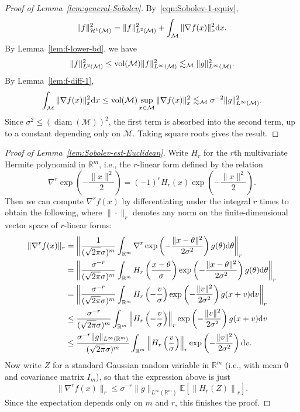 \documentclass[preprint]{imsart}
\theoremstyle{plain}
\theoremstyle{definition}
\newcommand{\Rbb}{\mathbb{R}}
\newcommand{\Ebb}{\mathbb{E}}
\newcommand{\Mcal}{\mathcal{M}}
\newcommand{\Hcal}{\mathcal{H}}
\newcommand{\diff}{\textnormal{d}}
\newcommand{\vol}{\textnormal{vol}}
\DeclareMathOperator{\diam}{diam}
\begin{document}
\begin{appendix}
\begin{proof}[Proof of Lemma~\ref{lem:general-Sobolev}]
By~\eqref{eqn:Sobolev-1-equiv},
\[
    \|f\|_{\Hcal^1(\Mcal)}^2
    =
    \|f\|_{L^2(\Mcal)}^2
    +
    \int_{\Mcal}\|\nabla f(x)\|_x^2\diff x.
\]
By Lemma~\ref{lem:f-lower-bd}, we have
\[
    \|f\|_{L^2(\Mcal)}^2
    \le
    \vol(\Mcal)\|f\|_{L^\infty(\Mcal)}^2
    \lesssim_\Mcal
    \|g\|_{L^\infty(\Mcal)}^2.
\]
By Lemma~\ref{lem:f-diff-1},
\[
    \int_{\Mcal}\|\nabla f(x)\|_x^2\diff x
    \le
    \vol(\Mcal)\sup_{x\in\Mcal}\|\nabla f(x)\|_x^2
    \lesssim_\Mcal
    \sigma^{-2}\|g\|_{L^\infty(\Mcal)}^2.
\]
Since $\sigma^2\le(\diam(\Mcal))^2$, the first term is absorbed into the second term, up to a constant depending only on $\Mcal$.
Taking square roots gives the result.
\end{proof}


\begin{proof}[Proof of Lemma~\ref{lem:Sobolev-est-Euclidean}]
    Write $H_r$ for the $r$th multivariate Hermite polynomial in $\Rbb^m$, i.e., the $r$-linear form defined by the relation
    \begin{equation*}
        \nabla^r\exp\left(-\frac{\|x\|^2}{2}\right) = (-1)^r H_r(x)\exp\left(-\frac{\|x\|^2}{2}\right).
    \end{equation*}
    Then we can compute $\nabla^r f(x)$ by differentiating under the integral $r$ times to obtain the following, where $\|\cdot\|_r$ denotes any norm on the finite-dimensional vector space of $r$-linear forms:
    \begin{align*}
        \|\nabla^rf(x)\|_{r} &= \left\|\frac{1}{(\sqrt{2\pi}\sigma)^m}\int_{\Rbb^m}\nabla^r\exp\left(-\frac{\|x-\theta\|^2}{2\sigma^2}\right)g(\theta)\diff \theta\right\|_{r} \\
        &= \left\|\frac{\sigma^{-r}}{(\sqrt{2\pi}\sigma)^m}\int_{\Rbb^m}H_r\left(\frac{x-\theta}{\sigma}\right)\exp\left(-\frac{\|x-\theta\|^2}{2\sigma^2}\right)g(\theta)\diff \theta\right\|_{r} \\
        &= \left\|\frac{\sigma^{-r}}{(\sqrt{2\pi}\sigma)^m}\int_{\Rbb^m}H_r\left(-\frac{v}{\sigma}\right)\exp\left(-\frac{\|v\|^2}{2\sigma^2}\right)g(x+v)\diff v\right\|_{r} \\
        &\le \frac{\sigma^{-r}}{(\sqrt{2\pi}\sigma)^m}\int_{\Rbb^m}\left\|H_r\left(-\frac{v}{\sigma}\right)\right\|_{r}\exp\left(-\frac{\|v\|^2}{2\sigma^2}\right)g(x+v)\diff v \\
        &\le \frac{\sigma^{-r}\|g\|_{L^{\infty}(\Rbb^m)}}{(\sqrt{2\pi}\sigma)^m}\int_{\Rbb^m}\left\|H_r\left(\frac{v}{\sigma}\right)\right\|_{r}\exp\left(-\frac{\|v\|^2}{2\sigma^2}\right)\diff v.
    \end{align*}
    Now write $Z$ for a standard Gaussian random variable in $\Rbb^m$ (i.e., with mean 0 and covariance matrix $I_m$), so that the expression above is just
    \begin{equation*}
        \|\nabla^rf(x)\|_{r} \le \sigma^{-r}\|g\|_{L^{\infty}(\Rbb^m)}\Ebb\left[\left\|H_r\left(Z\right)\right\|_{r}\right].
    \end{equation*}
    Since the expectation depends only on $m$ and $r$, this finishes the proof.
\end{proof}



\end{appendix}
\end{document}
